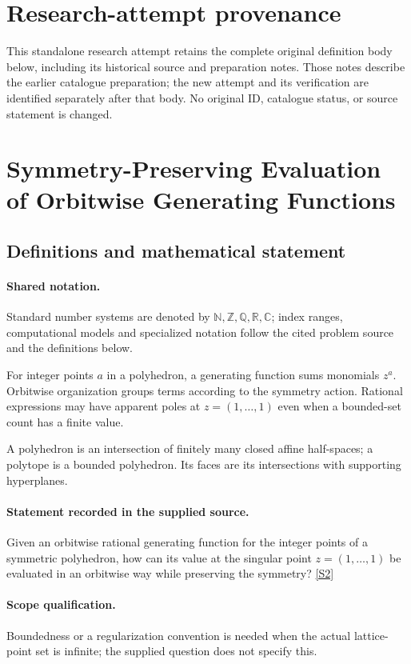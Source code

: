 \documentclass[11pt]{article}
\begin{document}
\section*{Research-attempt provenance}
This standalone research attempt retains the complete original definition body below,
including its historical source and preparation notes. Those notes describe the
earlier catalogue preparation; the new attempt and its verification are identified
separately after that body. No original ID, catalogue status, or source statement is changed.

\section{Symmetry-Preserving Evaluation of Orbitwise Generating Functions}\label{statement}

\subsection{Definitions and mathematical statement}

\paragraph{Shared notation.}Standard number systems are denoted by $\mathbb N,\mathbb Z,\mathbb Q,\mathbb R,\mathbb C$; index ranges, computational models and specialized notation follow the cited problem source and the definitions below.


For integer points $a$ in a polyhedron, a generating function sums monomials $z^a$. Orbitwise organization groups terms according to the symmetry action. Rational expressions may have apparent poles at $z=(1,\ldots,1)$ even when a bounded-set count has a finite value.

A polyhedron is an intersection of finitely many closed affine half-spaces; a polytope is a bounded polyhedron. Its faces are its intersections with supporting hyperplanes.
\paragraph{Statement recorded in the supplied source.}
Given an orbitwise rational generating function for the integer points of a symmetric polyhedron, how can its value at the singular point $z=(1,\ldots,1)$ be evaluated in an orbitwise way while preserving the symmetry? \href{https://doi.org/10.4171/owr/2010/38}{[S2]}
\paragraph{Scope qualification.}
Boundedness or a regularization convention is needed when the actual lattice-point set is infinite; the supplied question does not specify this.
\end{document}

